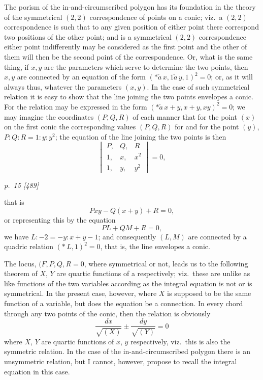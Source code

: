 \documentclass[11pt,a4paper]{article}
\theoremstyle{plain}
\theoremstyle{definition}
\begin{document}
The porism of the in-and-circumscribed polygon has its foundation in the theory
of the symmetrical $(2,2)$ correspondence of points on a conic; viz.\ a $(2,2)$ correspondence is such that to any given position of either point there correspond two
positions of the other point; and is a symmetrical $(2,2)$ correspondence either point
indifferently may be considered as the first point and the other of them will then be
the second point of the correspondence.  Or, what is the same thing, if $x, y$ are the
parameters which serve to determine the two points, then $x, y$ are connected by an
equation of the form $(*\!\check{a}\,x, 1\check{a}\,y, 1)^2 = 0$; or, as it will always thus, whatever the
parameters $(x, y)$.  In the case of such symmetrical relation it is easy to show that
the line joining the two points envelopes a conic.  For the relation may be expressed
in the form $(*\!\check{a}\,x + y, x + y, xy)^2 = 0$; we may imagine the coordinates $(P, Q, R)$ of
each manner that for the point $(x)$ on the first conic the corresponding values $(P, Q, R)$ for
and for the point $(y)$, $P : Q : R = 1 : y : y^2$; the equation of the line joining the two points is then
\[
\begin{vmatrix}
P, & Q, & R \\
1, & x, & x^2 \\
1, & y, & y^2
\end{vmatrix} = 0,
\]

\clearpage

\bigskip
\textit{p.~15 [489]}
\smallskip

\noindent
that is
\[
P x y - Q (x + y) + R = 0,
\]
or representing this by the equation
\[
P L + Q M + R = 0,
\]
we have $L : -2 = -y : x + y - 1$; and consequently $(L, M)$ are connected by a quadric relation $(\ast\,L, 1)^2 = 0$, that is, the line envelopes a conic.

The locus, $(F, P, Q, R = 0$, where symmetrical or not, leads us to the following theorem of $X$, $Y$ are quartic functions of a respectively; viz.\ these are unlike as like functions of the two variables according as the integral equation is not or is symmetrical.  In the present case, however, where $X$ is supposed to be the same function of a variable, but does the equation be a connection.  In every chord through any
two points of the conic, then the relation is obviously
\[
\frac{dx}{\sqrt{(X) }} \pm \frac{dy}{\sqrt{(Y)}} = 0
\]
where $X$, $Y$ are quartic functions of $x$, $y$ respectively, viz.\ this is also the symmetric relation.  In the case of the in-and-circumscribed polygon there is an unsymmetric relation, but I cannot, however, propose to recall the integral equation in this case.
\end{document}

